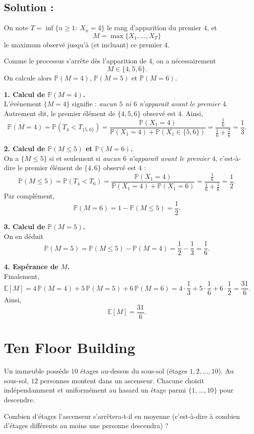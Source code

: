 \subsection*{Solution :}

On note $T=\inf\{n\ge 1:\ X_n=4\}$ le rang d'apparition du premier $4$, et
\[
M=\max\{X_1,\dots,X_T\}
\]
le maximum observé jusqu'à (et incluant) ce premier $4$.

Comme le processus s'arrête dès l'apparition de $4$, on a nécessairement
\[
M\in\{4,5,6\}.
\]
On calcule alors $\mathbb{P}(M=4)$, $\mathbb{P}(M=5)$ et $\mathbb{P}(M=6)$.

\medskip
\noindent\textbf{1. Calcul de $\mathbb{P}(M=4)$.}\\
L'événement $\{M=4\}$ signifie : \emph{aucun $5$ ni $6$ n'apparaît avant le premier $4$}.
Autrement dit, le premier élément de $\{4,5,6\}$ observé est $4$.
Ainsi,
\[
\mathbb{P}(M=4)=\mathbb{P}(T_4< T_{\{5,6\}})
=\frac{\mathbb{P}(X_1=4)}{\mathbb{P}(X_1=4)+\mathbb{P}(X_1\in\{5,6\})}
=\frac{\frac16}{\frac16+\frac26}
=\frac13.
\]

\medskip
\noindent\textbf{2. Calcul de $\mathbb{P}(M\le 5)$ et $\mathbb{P}(M=6)$.}\\
On a $\{M\le 5\}$ si et seulement si \emph{aucun $6$ n'apparaît avant le premier $4$}, c'est-à-dire
le premier élément de $\{4,6\}$ observé est $4$ :
\[
\mathbb{P}(M\le 5)=\mathbb{P}(T_4<T_6)
=\frac{\mathbb{P}(X_1=4)}{\mathbb{P}(X_1=4)+\mathbb{P}(X_1=6)}
=\frac{\frac16}{\frac16+\frac16}
=\frac12.
\]
Par complément,
\[
\mathbb{P}(M=6)=1-\mathbb{P}(M\le 5)=\frac12.
\]

\medskip
\noindent\textbf{3. Calcul de $\mathbb{P}(M=5)$.}\\
On en déduit
\[
\mathbb{P}(M=5)=\mathbb{P}(M\le 5)-\mathbb{P}(M=4)
=\frac12-\frac13
=\frac16.
\]

\medskip
\noindent\textbf{4. Espérance de $M$.}\\
Finalement,
\[
\mathbb{E}[M]
=4\,\mathbb{P}(M=4)+5\,\mathbb{P}(M=5)+6\,\mathbb{P}(M=6)
=4\cdot\frac13+5\cdot\frac16+6\cdot\frac12
=\frac{31}{6}.
\]
Ainsi,
\[
\boxed{\mathbb{E}[M]=\frac{31}{6}.}
\]



\section{Ten Floor Building}

\begin{exerciseBox}
Un immeuble possède $10$ étages au-dessus du sous-sol (étages $1,2,\dots,10$).
Au sous-sol, $12$ personnes montent dans un ascenseur. Chacune choisit indépendamment et
uniformément au hasard un étage parmi $\{1,\dots,10\}$ pour descendre.

Combien d'étages l'ascenseur s'arrêtera-t-il en moyenne (c'est-à-dire à combien d'étages
différents au moins une personne descendra) ?
\end{exerciseBox}

